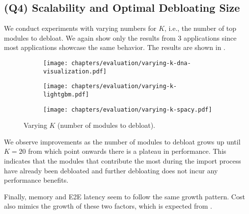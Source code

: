 \documentclass[sigplan,nonacm]{acmart}
\begin{document}
\subsection{(Q4) Scalability and Optimal Debloating Size}

We conduct experiments with varying numbers for $K$, i.e., the number of top modules to debloat.
We again show only the results from 3 applications since most applications showcase the same behavior.
The results are shown in .

\begin{figure}[t]
    \centering
\begin{subfigure}[b]{\linewidth}
        \centering
        \texttt{[image: chapters/evaluation/varying-k-dna-visualization.pdf]}
        \label{fig:k-dna}
    \end{subfigure}

    \vspace{-1em}

\begin{subfigure}[b]{\linewidth}
        \centering
        \texttt{[image: chapters/evaluation/varying-k-lightgbm.pdf]}
        \label{fig:k-lightgbm}
    \end{subfigure}

    \vspace{-1em}

\begin{subfigure}[b]{\linewidth}
        \centering
        \texttt{[image: chapters/evaluation/varying-k-spacy.pdf]}
        \label{fig:k-spacy}
    \end{subfigure}

    \vspace{-0.8em}
    
    \caption{Varying $K$ (number of modules to debloat).}
    \label{fig:varying-k}
\end{figure}

We observe improvements as the number of modules to debloat grows up until $K=20$ from which point onwards there is a plateau in performance.
This indicates that the modules that contribute the most during the import process have already been debloated and further debloating does not incur any performance benefits.

Finally, memory and E2E latency seem to follow the same growth pattern.
Cost also mimics the growth of these two factors, which is expected from . 
\end{document}

